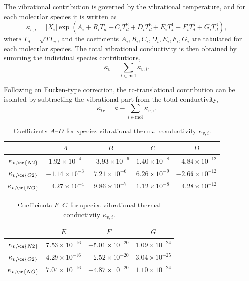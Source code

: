 The vibrational contribution is governed by the vibrational temperature, and for each molecular species it is written as
%
\begin{equation}
\kappa_{v,i} = |X_i| \exp \!\left( 
A_i + B_i T_d + C_i T_d^2 + D_i T_d^3 + E_i T_d^4 + F_i T_d^5 + G_i T_d^6 
\right),
\label{eq:kappa_vi}
\end{equation}
%
where $T_d = \sqrt{T T_v}$, and the coefficients $A_i, B_i, C_i, D_i, E_i, F_i, G_i$ are tabulated for each molecular species. The total vibrational conductivity is then obtained by summing the individual species contributions,
%
\begin{equation}
\kappa_v = \sum_{i \in \mathrm{mol}} \kappa_{v,i}.
\label{eq:kappa_v}
\end{equation}

Following an Eucken-type correction, the ro-translational contribution can be isolated by subtracting the vibrational part from the total conductivity,
%
\begin{equation}
\kappa_{tr} = \kappa - \sum_{i \in \mathrm{mol}} \kappa_{v,i}.
\label{eq:kappa_tr}
\end{equation}

\begin{table}[ht]
    \centering
    \caption{Coefficients $A$–$D$ for species vibrational thermal conductivity $\kappa_{v,i}$.}
    \renewcommand{\arraystretch}{1.2}
    \begin{tabular}{c c c c c}
        \hline
        & $A$ & $B$ & $C$ & $D$ \\
        \hline
        $\kappa_{v,\ce{N2}}$ & $1.92\times 10^{-4}$ & $-3.93\times 10^{-6}$ & $1.40\times 10^{-8}$ & $-4.84\times 10^{-12}$ \\
        $\kappa_{v,\ce{O2}}$ & $-1.14\times 10^{-3}$ & $7.21\times 10^{-6}$  & $6.26\times 10^{-9}$ & $-2.66\times 10^{-12}$ \\
        $\kappa_{v,\ce{NO}}$ & $-4.27\times 10^{-4}$ & $9.86\times 10^{-7}$  & $1.12\times 10^{-8}$ & $-4.28\times 10^{-12}$ \\
        \hline
    \end{tabular}
    \label{tab:vibrational_coeffs_AD}
\end{table}


\begin{table}[ht]
    \centering
    \caption{Coefficients $E$–$G$ for species vibrational thermal conductivity $\kappa_{v,i}$.}
    \renewcommand{\arraystretch}{1.2}
    \begin{tabular}{c c c c}
        \hline
        & $E$ & $F$ & $G$ \\
        \hline
        $\kappa_{v,\ce{N2}}$ & $7.53\times 10^{-16}$ & $-5.01\times 10^{-20}$ & $1.09\times 10^{-24}$ \\
        $\kappa_{v,\ce{O2}}$ &$4.29\times 10^{-16}$                   & $-2.52\times 10^{-20}$ & $3.04\times 10^{-25}$ \\
        $\kappa_{v,\ce{NO}}$ & $7.04\times 10^{-16}$ & $-4.87\times 10^{-20}$ & $1.10\times 10^{-24}$ \\
        \hline
    \end{tabular}
    \label{tab:vibrational_coeffs_EG}
\end{table}


